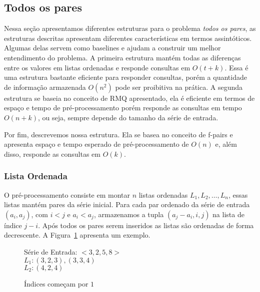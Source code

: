 \documentclass[12pt]{article}
\begin{document}
\subsection{Todos os pares}

Nessa seção apresentamos diferentes estruturas
para o problema \textit{todos os pares}, as estruturas descritas apresentam diferentes
características em termos assintóticos. Algumas delas
servem como baselines e ajudam a construir um melhor entendimento do problema.
A primeira estrutura mantém todas as diferenças entre os valores 
em listas ordenadas e responde consultas em $O(t + k)$. 
Essa é uma estrutura bastante eficiente para responder consultas,
porém a quantidade de informação armazenada $O(n^2)$ pode ser 
proibitiva na prática. A segunda estrutura se baseia no conceito de RMQ apresentado,
ela é eficiente em termos de espaço e tempo de pré-processamento
porém responde as consultas em tempo $O(n + k)$, ou seja,
sempre depende do tamanho da série de entrada. 

Por fim, descrevemos nossa estrutura. Ela se basea
no conceito de f-pairs e apresenta espaço e tempo esperado de 
pré-processamento de $O(n)$ e, além disso, responde as consultas em $O(k)$.


\subsubsection{Lista Ordenada}

O pré-processamento consiste em montar $n$ listas ordenadas $L_1, L_2, \ldots, L_n$, 
essas listas mantém pares da série inicial. Para cada par ordenado da série de entrada $(a_i, a_j)$, com $i < j$ e $a_i < a_j$,
armazenamos a tupla $(a_j - a_i, i, j)$ na lista de índice $j - i$.
Após todos os pares serem inseridos as listas são ordenadas de forma decrescente. A Figura~\ref{fig:exemplolista} apresenta um exemplo.

\clearpage
\begin{center}
\begin{figure}
\begin{framed}
Série de Entrada: $<3, 2, 5, 8>$ \\
$L_1: (3, 2, 3), (3, 3, 4)$ \\
$L_2: (4, 2, 4)$ \\
\caption{Índices começam por $1$}
\label{fig:exemplolista}
\end{framed}
\end{figure}
\end{center}
\end{document}
